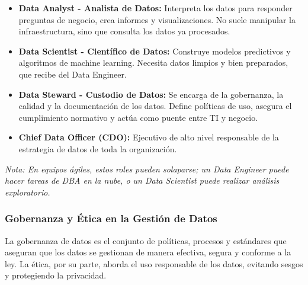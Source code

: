 \documentclass[12pt,a4paper,openany,oneside]{book}
\begin{document}
\begin{itemize}
\begin{itemize}
            \item \textbf{Ejemplo:} Un Data Engineer construye un flujo que cada hora ingiere los pedidos de una tienda online, los limpia (elimina duplicados, corrige formatos) y los carga en un data warehouse para análisis de ventas.
        \end{itemize}
    \item \textbf{Data Analyst - Analista de Datos:} Interpreta los datos para responder preguntas de negocio, crea informes y visualizaciones. No suele manipular la infraestructura, sino que consulta los datos ya procesados.
    \item \textbf{Data Scientist - Científico de Datos:} Construye modelos predictivos y algoritmos de machine learning. Necesita datos limpios y bien preparados, que recibe del Data Engineer.
    \item \textbf{Data Steward - Custodio de Datos:} Se encarga de la gobernanza, la calidad y la documentación de los datos. Define políticas de uso, asegura el cumplimiento normativo y actúa como puente entre TI y negocio.
    \item \textbf{Chief Data Officer (CDO):} Ejecutivo de alto nivel responsable de la estrategia de datos de toda la organización.
\end{itemize}

\begin{center}
    \textit{Nota: En equipos ágiles, estos roles pueden solaparse; un Data Engineer puede hacer tareas de DBA en la nube, o un Data Scientist puede realizar análisis exploratorio.}
\end{center}

\subsubsection{Gobernanza y Ética en la Gestión de Datos}

La gobernanza de datos es el conjunto de políticas, procesos y estándares que aseguran que los datos se gestionan de manera efectiva, segura y conforme a la ley. La ética, por su parte, aborda el uso responsable de los datos, evitando sesgos y protegiendo la privacidad.
\end{document}
